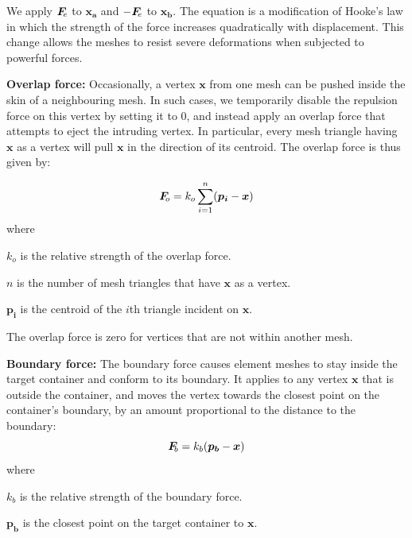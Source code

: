 We apply $\simforce{e}$ to $\bm{x_{a}}$ and $-\simforce{e}$ to $\bm{x_{b}}$.
The equation is a modification of Hooke's law
in which the strength of the force increases quadratically
with displacement.
This change allows the meshes to resist severe deformations
when subjected to powerful forces.




\medskip
\textbf{Overlap force:}
Occasionally, a vertex $\bm{x}$ from one mesh can be pushed inside the skin of a
neighbouring mesh.  In such cases, we temporarily disable the repulsion force
on this vertex
by setting it to 0, and instead apply an overlap force that attempts to
eject the intruding vertex.  In particular, every mesh triangle having $\bm{x}$
as a vertex will pull $\bm{x}$ in the direction of its centroid.  The overlap
force is thus given by:

\begin{equation}
\simforce{o} = k_o \sum_{i = 1}^{n} (\bm{p_{i}} - \bm{x})
\end{equation}
where
\begin{packeddescriptions}
	\item[$k_o$] is the relative strength of the overlap force.
	\item[$n$] is the number of mesh triangles that have $\bm{x}$ as a vertex.
	\item[$\bm{p_{i}}$] is the centroid of the $i$th triangle incident on $\bm{x}$.
\end{packeddescriptions}

The overlap force is zero for vertices that are not within another mesh.

\medskip
\textbf{Boundary force:}
The boundary force causes element meshes to stay inside the target container
and conform to its boundary. It applies to any vertex $\bm{x}$ that
is outside the container, and moves the vertex towards the closest point
on the container's boundary, by an amount proportional to the distance to
the boundary:
\begin{equation}
\simforce{b} = k_{b} (\bm{p_b} - \bm{x})
\end{equation}
where
\begin{packeddescriptions}
	\item[$k_b$] is the relative strength of the boundary force.
	\item[$\bm{p_b}$] is the closest point on the target container to $\bm{x}$.
\end{packeddescriptions}

